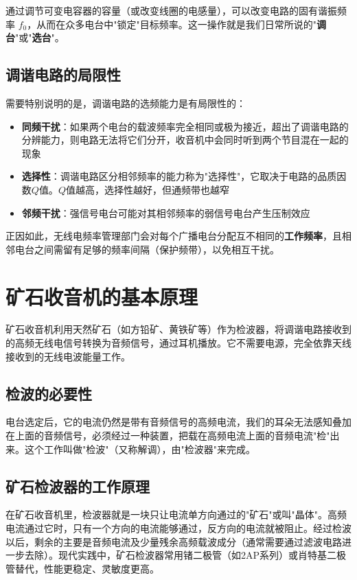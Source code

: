\documentclass[12pt,UTF8]{ctexbook}
\begin{document}
通过调节可变电容器的容量（或改变线圈的电感量），可以改变电路的固有谐振频率 $f_0$，从而在众多电台中"锁定"目标频率。这一操作就是我们日常所说的"\textbf{调台}"或"\textbf{选台}"。

\subsection{调谐电路的局限性}

需要特别说明的是，调谐电路的选频能力是有局限性的：

\begin{itemize}
	\item \textbf{同频干扰}：如果两个电台的载波频率完全相同或极为接近，超出了调谐电路的分辨能力，则电路无法将它们分开，收音机中会同时听到两个节目混在一起的现象
	\item \textbf{选择性}：调谐电路区分相邻频率的能力称为"选择性"，它取决于电路的品质因数$Q$值。$Q$值越高，选择性越好，但通频带也越窄
	\item \textbf{邻频干扰}：强信号电台可能对其相邻频率的弱信号电台产生压制效应
\end{itemize}

正因如此，无线电频率管理部门会对每个广播电台分配互不相同的\textbf{工作频率}，且相邻电台之间需留有足够的频率间隔（保护频带），以免相互干扰。

\section{矿石收音机的基本原理}

矿石收音机利用天然矿石（如方铅矿、黄铁矿等）作为检波器，将调谐电路接收到的高频无线电信号转换为音频信号，通过耳机播放。它不需要电源，完全依靠天线接收到的无线电波能量工作。

\subsection{检波的必要性}

电台选定后，它的电流仍然是带有音频信号的高频电流，我们的耳朵无法感知叠加在上面的音频信号，必须经过一种装置，把载在高频电流上面的音频电流"检"出来。这个工作叫做"检波"（又称解调），由"检波器"来完成。

\subsection{矿石检波器的工作原理}

在矿石收音机里，检波器就是一块只让电流单方向通过的"矿石"或叫"晶体"。高频电流通过它时，只有一个方向的电流能够通过，反方向的电流就被阻止。经过检波以后，剩余的主要是音频电流及少量残余高频载波成分（通常需要通过滤波电路进一步去除）。现代实践中，矿石检波器常用锗二极管（如2AP系列）或肖特基二极管替代，性能更稳定、灵敏度更高。
\end{document}
